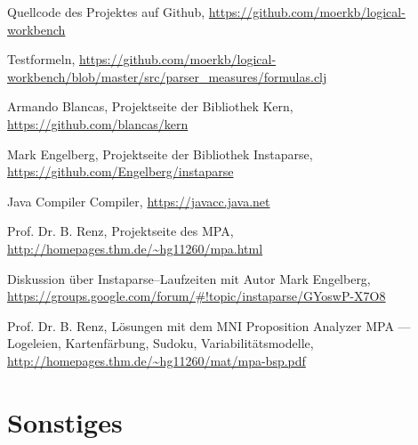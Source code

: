 \documentclass[ngerman,a4paper,abstracton,open=right,twoside=false,toc=listofnumbered,bibtotocnumbered]{scrreprt}
\begin{document}
\begin{thebibliography}{7}
		Quellcode des Projektes auf Github, 
		\url{https://github.com/moerkb/logical-workbench}

		Testformeln,
		\url{https://github.com/moerkb/logical-workbench/blob/master/src/parser_measures/formulas.clj}

		Armando Blancas,
		Projektseite der Bibliothek Kern, 
		\url{https://github.com/blancas/kern}

		Mark Engelberg,
		Projektseite der Bibliothek Instaparse,
		\url{https://github.com/Engelberg/instaparse}

		Java Compiler Compiler,
		\url{https://javacc.java.net}

		Prof. Dr. B. Renz,
		Projektseite des MPA,
		\url{http://homepages.thm.de/~hg11260/mpa.html}

		Diskussion über Instaparse--Laufzeiten mit Autor Mark Engelberg, 
		\url{https://groups.google.com/forum/#!topic/instaparse/GYoswP-X7O8}

		Prof. Dr. B. Renz,
		Lösungen mit dem MNI Proposition Analyzer MPA --- Logeleien, Kartenfärbung, Sudoku, Variabilitätsmodelle,
		\url{http://homepages.thm.de/~hg11260/mat/mpa-bsp.pdf}
\end{thebibliography}

\listoffigures %
\listoftables

\chapter{Sonstiges}
\end{document}
